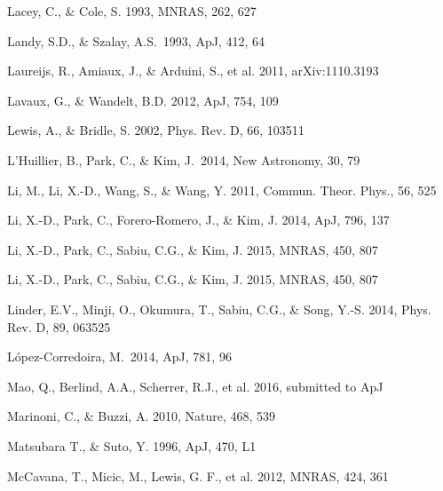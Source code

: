 \documentclass[useAMS,usenatbib]{mnras}
\begin{document}
\begin{thebibliography}{}
Lacey, C., \& Cole, S. 1993, MNRAS, 262, 627


Landy, S.D., \& Szalay, A.S.\ 1993, ApJ, 412, 64 

Laureijs, R., Amiaux, J., \& Arduini, S., et al. 2011, arXiv:1110.3193

Lavaux, G., \& Wandelt, B.D. 2012, ApJ, 754, 109  


Lewis, A., \& Bridle, S. 2002, Phys. Rev. D, 66, 103511

L'Huillier, B., Park, C., \& Kim, J.\ 2014, New Astronomy, 30, 79 

Li, M., Li, X.-D., Wang, S., \& Wang, Y. 2011, Commun. Theor. Phys., 56, 525

Li, X.-D., Park, C., Forero-Romero, J., \& Kim, J. 2014, ApJ, 796, 137

Li, X.-D., Park, C., Sabiu, C.G., \& Kim, J. 2015, MNRAS, 450, 807 

Li, X.-D., Park, C., Sabiu, C.G., \& Kim, J. 2015, MNRAS, 450, 807 


Linder, E.V., Minji, O., Okumura, T., Sabiu, C.G., \& Song, Y.-S. 2014, Phys. Rev. D, 89, 063525  

L{\'o}pez-Corredoira, M.\ 2014, ApJ, 781, 96 

Mao, Q., Berlind, A.A., Scherrer, R.J., et al. 2016, submitted to ApJ

Marinoni, C., \& Buzzi, A. 2010, Nature, 468, 539  

Matsubara T., \& Suto, Y. 1996, ApJ, 470, L1  

McCavana, T., Micic, M., Lewis, G. F., et al. 2012, MNRAS, 424, 361



\end{thebibliography}
\end{document}
